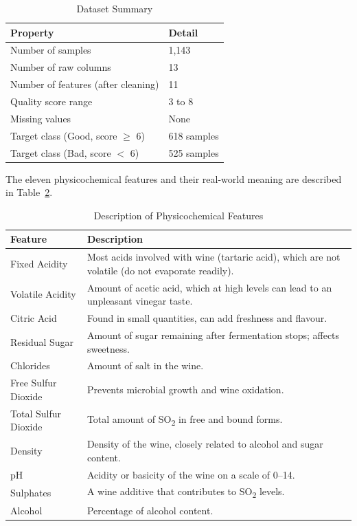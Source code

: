 \documentclass[11pt,a4paper]{article}
\begin{document}
\begin{table}[H]
    \centering
    \caption{Dataset Summary}
    \label{tab:dataset}
    \begin{tabular}{ll}
        \toprule
        \textbf{Property} & \textbf{Detail} \\
        \midrule
        Number of samples & 1,143 \\
        Number of raw columns & 13 \\
        Number of features (after cleaning) & 11 \\
        Quality score range & 3 to 8 \\
        Missing values & None \\
        Target class (Good, score $\geq$ 6) & 618 samples \\
        Target class (Bad, score $<$ 6) & 525 samples \\
        \bottomrule
    \end{tabular}
\end{table}

The eleven physicochemical features and their real-world meaning are described in Table~\ref{tab:features}.

\begin{table}[H]
    \centering
    \caption{Description of Physicochemical Features}
    \label{tab:features}
    \begin{tabularx}{\textwidth}{lX}
        \toprule
        \textbf{Feature} & \textbf{Description} \\
        \midrule
        Fixed Acidity & Most acids involved with wine (tartaric acid), which are not volatile (do not evaporate readily). \\
        Volatile Acidity & Amount of acetic acid, which at high levels can lead to an unpleasant vinegar taste. \\
        Citric Acid & Found in small quantities, can add freshness and flavour. \\
        Residual Sugar & Amount of sugar remaining after fermentation stops; affects sweetness. \\
        Chlorides & Amount of salt in the wine. \\
        Free Sulfur Dioxide & Prevents microbial growth and wine oxidation. \\
        Total Sulfur Dioxide & Total amount of SO\textsubscript{2} in free and bound forms. \\
        Density & Density of the wine, closely related to alcohol and sugar content. \\
        pH & Acidity or basicity of the wine on a scale of 0--14. \\
        Sulphates & A wine additive that contributes to SO\textsubscript{2} levels. \\
        Alcohol & Percentage of alcohol content. \\
        \bottomrule
    \end{tabularx}
\end{table}
\end{document}
